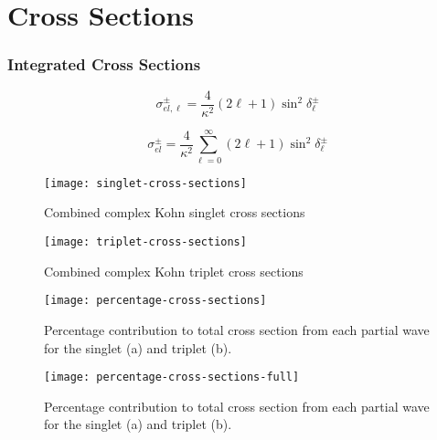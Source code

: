 \documentclass[Dissertation.tex]{subfiles}
\begin{document}
\clearpage
\pagebreak
\newpage

\chapter{Cross Sections}
\label{chp:CrossSections}


\subsection{Integrated Cross Sections}
\label{sec:totalcross}

\begin{equation}
\label{eq:PartialCross}
\sigma_{el,\ell}^\pm = \frac{4}{\kappa^2} (2\ell+1) \sin^2 \delta_\ell^\pm
\end{equation}

\begin{equation}
\label{eq:TotalCross}
\sigma_{el}^\pm = \frac{4}{\kappa^2} \sum_{\ell=0}^\infty (2\ell+1) \sin^2 \delta_\ell^\pm
\end{equation}

\begin{figure}[H]
	\centering
	\texttt{[image: singlet-cross-sections]}
	\caption{Combined complex Kohn singlet cross sections}
	\label{fig:singlet-cross-sections}
\end{figure}

\begin{figure}[H]
	\centering
	\texttt{[image: triplet-cross-sections]}
	\caption{Combined complex Kohn triplet cross sections}
	\label{fig:triplet-cross-sections}
\end{figure}

\begin{figure}[H]
	\centering
	\texttt{[image: percentage-cross-sections]}
	\caption[Percentage contribution to total cross section]{Percentage contribution to total cross section from each partial wave for the singlet (a) and triplet (b).}
	\label{fig:percentage-cross-sections}
\end{figure}

\begin{figure}[H]
	\centering
	\texttt{[image: percentage-cross-sections-full]}
	\caption[Percentage contribution to total cross section]{Percentage contribution to total cross section from each partial wave for the singlet (a) and triplet (b).}
	\label{fig:percentage-cross-sections-full}
\end{figure}
\end{document}
